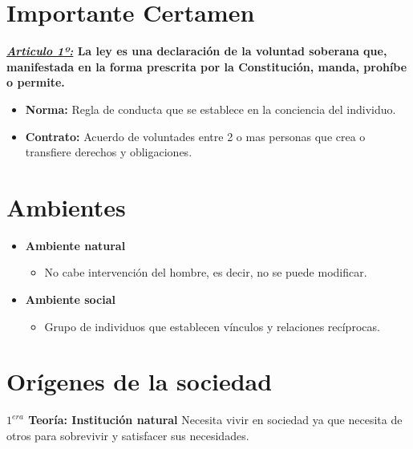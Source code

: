 \documentclass{templateNote}
\begin{document}


\portada
\margenes 
\tableofcontents
\newpage


\section{Importante Certamen}
\noindent\textbf{\textit{\href{https://www.bcn.cl/portal/}{Articulo 1º:}} La ley es una declaración de la voluntad soberana que, manifestada en la forma prescrita por la Constitución, manda, prohíbe o permite.}
\begin{itemize}
    \item \textbf{Norma:} Regla de conducta que se establece en la conciencia del individuo.
    \item \textbf{Contrato:} Acuerdo de voluntades entre 2 o mas personas que crea o transfiere derechos y obligaciones.
\end{itemize}


\newpage
\section{Ambientes}
\begin{itemize}
    \item \textbf{Ambiente natural}
    \begin{itemize}
        \item No cabe intervención del hombre, es decir, no se puede modificar.
    \end{itemize}
    
    \item \textbf{Ambiente social}
    \begin{itemize}
        \item Grupo de individuos que establecen vínculos y relaciones recíprocas.
    \end{itemize}
\end{itemize}

\section{Orígenes de la sociedad}
\noindent\textbf{$1^{era}$ Teoría: Institución natural}
\noindent Necesita vivir en sociedad ya que necesita de otros para sobrevivir y satisfacer sus necesidades.
\end{document}
